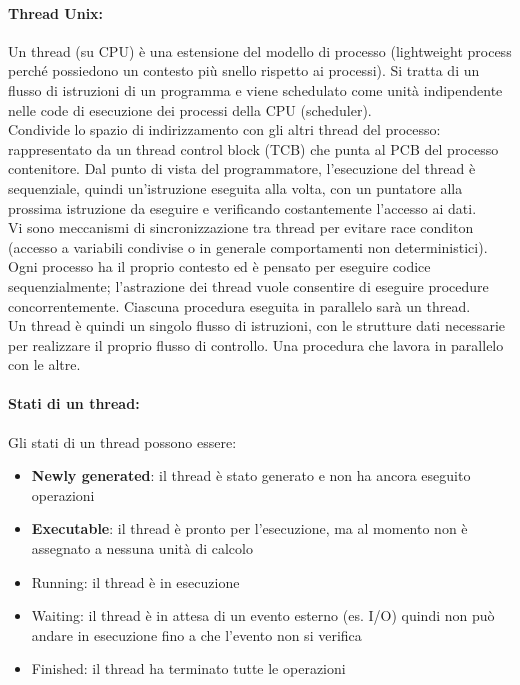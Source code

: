 \paragraph{Thread Unix:} Un thread (su CPU) è una estensione del modello di processo (lightweight process perché possiedono un contesto più snello rispetto ai processi). Si tratta di un flusso di istruzioni di un programma e viene schedulato come unità indipendente nelle code di esecuzione dei processi della CPU (scheduler).\\
Condivide lo spazio di indirizzamento con gli altri thread del processo: rappresentato da un thread control block (TCB) che punta al PCB del processo contenitore. Dal punto di vista del programmatore, l’esecuzione del thread è sequenziale, quindi un'istruzione eseguita alla volta, con un puntatore alla prossima istruzione da eseguire e verificando costantemente l’accesso ai dati.\\
Vi sono meccanismi di sincronizzazione tra thread per evitare race conditon (accesso a variabili condivise o in generale comportamenti non deterministici).\\

Ogni processo ha il proprio contesto ed è pensato per eseguire codice sequenzialmente; l'astrazione dei thread vuole consentire di eseguire procedure concorrentemente. Ciascuna procedura eseguita in parallelo sarà un thread.\\
Un thread è quindi un singolo flusso di istruzioni, con le strutture dati necessarie per realizzare il proprio flusso di controllo. Una procedura che lavora in parallelo con le altre.\\

\paragraph{Stati di un thread:} Gli stati di un thread possono essere:
\begin{itemize}
	\item \textbf{Newly generated}: il thread è stato generato e non ha ancora eseguito operazioni
	\item \textbf{Executable}: il thread è pronto per l'esecuzione, ma al momento non è assegnato a nessuna unità di calcolo
	\item Running: il thread è in esecuzione
	\item Waiting: il thread è in attesa di un evento esterno (es. I/O) quindi non può andare in esecuzione fino a che l'evento non si verifica
	\item Finished: il thread ha terminato tutte le operazioni
\end{itemize}

\newpage